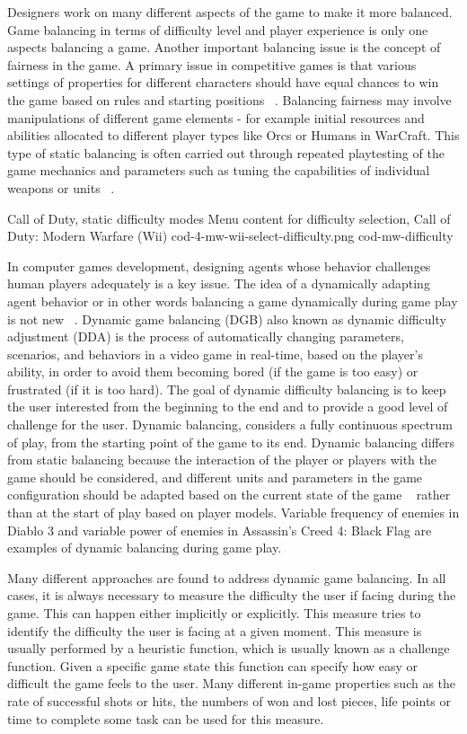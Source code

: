 Designers work on many different aspects of the game to make it more balanced. Game balancing in terms of difficulty level and player experience is only one aspects balancing a game. Another important balancing issue is the concept of fairness in the game. A primary issue in competitive games is that various settings of properties for different characters should have equal chances to win the game based on rules and starting positions ~\cite{rollings2003andrew}. Balancing fairness may involve manipulations of different game elements - for example initial resources and abilities allocated to different player  types like Orcs or Humans in WarCraft. This type of static balancing is often carried out through repeated playtesting of the game mechanics and parameters such as tuning the capabilities of individual weapons or units ~\cite{boll2003paper, rollings2003andrew}.

\largeimg
{Call of Duty, static difficulty modes}
{Menu content for difficulty selection, Call of Duty: Modern Warfare (Wii)}
{cod-4-mw-wii-select-difficulty.png}
{cod-mw-difficulty}

In computer games development, designing agents whose behavior challenges human players adequately is a key issue. The idea of a dynamically adapting agent behavior or in other words balancing a game dynamically during game play is not new ~\cite{andrade2005automatic}. Dynamic game balancing (DGB) also known as dynamic difficulty adjustment (DDA) is the process of automatically changing parameters, scenarios, and behaviors in a video game in real-time, based on the player's ability, in order to avoid them becoming bored (if the game is too easy) or frustrated (if it is too hard). The goal of dynamic difficulty balancing is to keep the user interested from the beginning to the end and to provide a good level of challenge for the user. Dynamic balancing, considers a fully continuous spectrum of play, from the starting point of the game to its end. Dynamic balancing differs from static balancing because the interaction of the player or players with the game should be considered, and different units and parameters in the game configuration should be adapted based on the current state of the game ~\cite{tan2011dynamic} rather than at the start of play based on player models. Variable frequency of enemies in Diablo 3 and variable power of enemies in Assassin's Creed 4: Black Flag are examples of dynamic balancing during game play.

Many different approaches are found to address dynamic game balancing. In all cases, it is always necessary to measure the difficulty the user if facing during the game. This can happen either implicitly or explicitly. This measure tries to identify the difficulty the user is facing at a given moment. This measure is usually performed by a heuristic function, which is usually known as a challenge function. Given a specific game state this function can specify how easy or difficult the game feels to the user. Many different in-game properties such as the rate of successful shots or hits, the numbers of won and lost pieces, life points or time to complete some task can be used for this measure.

